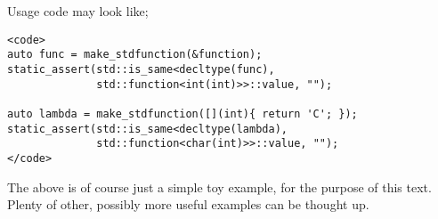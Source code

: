 Usage code may look like;
\begin{verbatim}
<code>
auto func = make_stdfunction(&function);
static_assert(std::is_same<decltype(func),
              std::function<int(int)>>::value, "");

auto lambda = make_stdfunction([](int){ return 'C'; });
static_assert(std::is_same<decltype(lambda),
              std::function<char(int)>>::value, "");
</code>
\end{verbatim}
The above is of course just a simple toy example, for the purpose of this text.
Plenty of other, possibly more useful examples can be thought up. 
